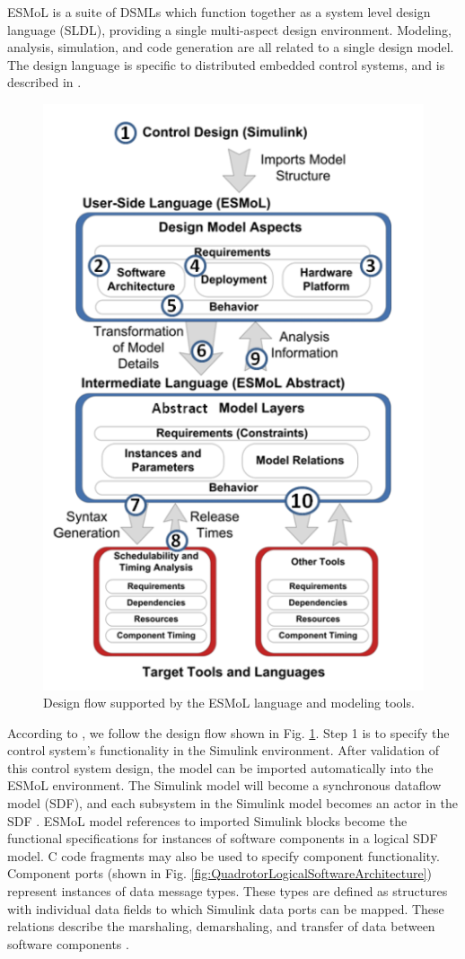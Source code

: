 \documentclass[10pt, conference, compsocconf]{IEEEtran}
\begin{document}
ESMoL is a suite of DSMLs which function together as a system level design language (SLDL), providing a single multi-aspect design environment. Modeling, analysis, simulation, and code generation are all related to a single design model. The design language is specific to distributed embedded control systems, and is described in \cite{modeling:esmol}.

\begin{figure}[!t]
\centering
\includegraphics[width=0.80\columnwidth]{figures/designflow.png}
\caption{Design flow supported by the ESMoL language and modeling tools.}
\label{fig:designflow}
\end{figure}

According to \cite{modeling:esmol}, we follow the design flow shown in Fig. \ref{fig:designflow}. Step 1 is to specify the control system's functionality in the Simulink environment. After validation of this control system design, the model can be imported automatically into the ESMoL environment. The Simulink model will become a synchronous dataflow model (SDF), and each subsystem in the Simulink model becomes an actor in the SDF \cite{moc:sdf}. ESMoL model references to imported Simulink blocks become the functional specifications for instances of software components in a logical SDF model. C code fragments may also be used to specify component functionality. Component ports (shown in Fig. \ref{fig:QuadrotorLogicalSoftwareArchitecture}) represent instances of data message types. These types are defined as structures with individual data fields to which Simulink data ports can be mapped. These relations describe the marshaling, demarshaling, and transfer of data between software components \cite{modeling:esmol}.
\end{document}
